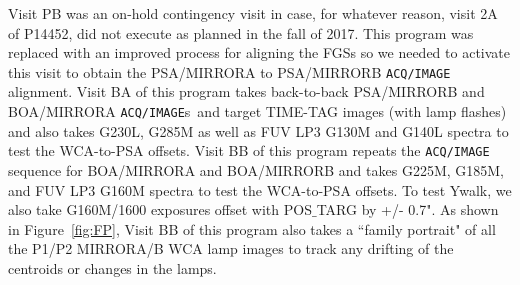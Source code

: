 \documentclass[12pt]{reportj}
\newcommand{\pid}[1]{{\rm P}#1}
\newcommand{\tacq}[1]{\texttt{ACQ/#1}}
\begin{document}
Visit PB was an on-hold contingency visit in case, for whatever reason, visit 2A of \pid{14452}, did not execute as planned in the fall of 2017. This program was replaced with an improved process for aligning the FGSs so we needed to activate this visit to obtain the PSA/MIRRORA to PSA/MIRRORB \tacq{IMAGE}  alignment.
Visit BA of this program takes back-to-back PSA/MIRRORB and  BOA/MIRRORA \tacq{IMAGE}s~and target TIME-TAG images (with lamp flashes) and also takes G230L, G285M as well as FUV LP3 G130M and G140L spectra to test the WCA-to-PSA offsets.
Visit BB of this program repeats the \tacq{IMAGE} sequence for BOA/MIRRORA and BOA/MIRRORB and takes G225M, G185M, and FUV LP3 G160M spectra to test the WCA-to-PSA offsets. To test Ywalk, we also take G160M/1600 exposures offset with {POS$\_$TARG} by +/- 0.7".
As shown in Figure~\ref{fig:FP}, Visit BB of this program also takes a ``family portrait" of all the P1/P2 MIRRORA/B WCA lamp images to track any drifting of the centroids or changes in the lamps.
\end{document}
